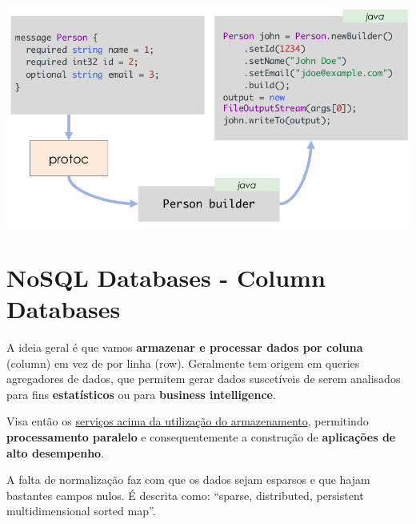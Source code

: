\documentclass{article}
\begin{document}
\begin{center}
  \includegraphics[scale=0.3]{67}
\end{center}

\pagebreak
\section{NoSQL Databases - Column Databases}

A ideia geral é que vamos \textbf{armazenar e processar dados por coluna} (column) em vez de por linha
(row). Geralmente tem origem em queries agregadores de dados, que permitem gerar
dados suscetíveis de serem analisados para fins \textbf{estatísticos} ou para \textbf{business intelligence}.

Visa então os \uline{serviços acima da utilização do armazenamento}, permitindo \textbf{processamento paralelo}
e consequentemente a construção de \textbf{aplicações de alto desempenho}.

A falta de normalização faz com que os dados sejam esparsos e que hajam bastantes campos
nulos. É descrita como: “sparse, distributed, persistent
multidimensional sorted map”.
\end{document}

